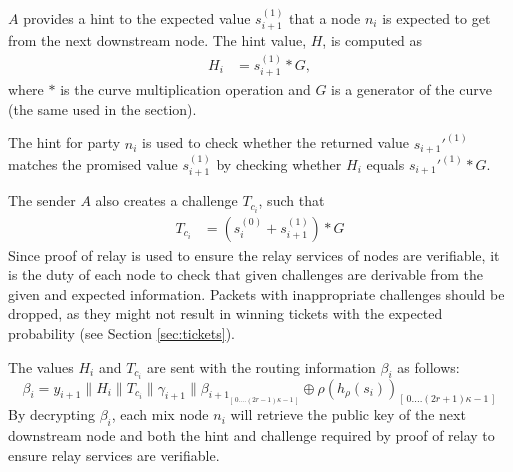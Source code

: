 $A$ provides a hint to the expected value $s_{i+1}^{(1)}$ that a node $n_i$ is expected to get from the next downstream node.
The hint value, $H$, is computed as
\begin{align}
    H_i & =s_{i+1}^{(1)}*G,
\end{align}
where $*$ is the curve multiplication operation and $G$ is a generator of the curve (the same used in the  section).

The hint for party $n_i$ is used to check whether the returned value $s_{i+1}'^{(1)}$ matches the promised value $s_{i+1}^{(1)}$ by checking whether $H_i$ equals $s_{i+1}'^{(1)}*G$.

The sender $A$ also creates a challenge $T_{c_i}$, such that
\begin{align}
    T_{c_i} & =(s_i^{(0)}+s_{i+1}^{(1)})*G
\end{align}
Since proof of relay is used to ensure the relay services of nodes are verifiable, it is the duty of each node to check that given challenges are derivable from the given and expected information. Packets with inappropriate challenges should be dropped, as they might not result in winning tickets with the expected probability (see Section \ref{sec:tickets}).

The values $H_i$ and $T_{c_i}$ are sent with the routing information $\beta_i$ as follows:
$$\beta_i=y_{i+1}\|H_i\|T_{c_i}\|\gamma_{i+1}\|\beta_{{i+1}_{[ \,0....(2r-1)\kappa-1\,] }}\oplus \rho(h_{\rho}(s_{i}))_{[ \,0....(2r+1)\kappa-1\,]}$$
By decrypting $\beta_i$, each mix node $n_i$ will retrieve the public key of the next downstream node and both the hint and challenge required by proof of relay to ensure relay services are verifiable.

